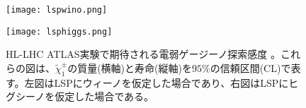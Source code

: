 \begin{figure}[tbp]
  \begin{minipage}[b]{0.5\linewidth}
    \centering
    \texttt{[image: lspwino.png]}
  \end{minipage}
  \begin{minipage}[b]{0.5\linewidth}
    \centering
    \texttt{[image: lsphiggs.png]}
  \end{minipage}
  \caption[HL-LHC ATLAS実験で期待される電弱ゲージーノ探索感度]{HL-LHC ATLAS実験で期待される電弱ゲージーノ探索感度 \cite{winos}。これらの図は、$\tilde{\chi}_1^{\pm}$の質量(横軸)と寿命(縦軸)を$95\%$の信頼区間(CL)で表す。左図はLSPにウィーノを仮定した場合であり、右図はLSPにヒグシーノを仮定した場合である。}
  \label{fig:sokuteiyosoudesu}
\end{figure}





\newpage
